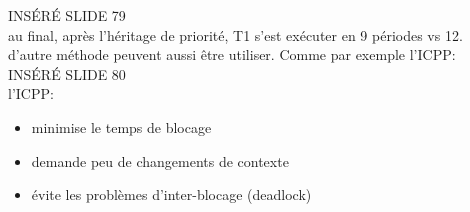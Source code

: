 \documentclass[oneside]{book}
\begin{document}
    INSÉRÉ SLIDE 79\\
    
    au final, après l'héritage de priorité, T1 s'est exécuter en 9 périodes vs 12.\\
    
    d'autre méthode peuvent aussi être utiliser. Comme par exemple l'ICPP:\\
    
    INSÉRÉ SLIDE 80\\
    
    l'ICPP:\\
    \begin{itemize}
        \item minimise le temps de blocage
        \item demande peu de changements de contexte
        \item évite les problèmes d'inter-blocage (deadlock)
    \end{itemize}
    
    
    
    
\end{document}
